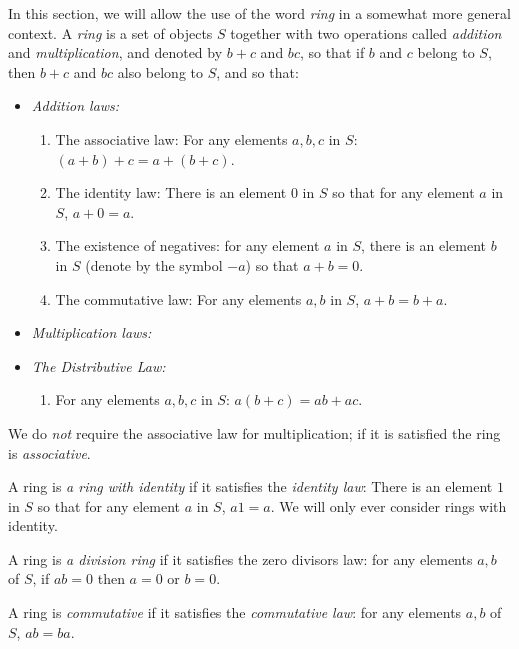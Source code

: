 In this section, we will allow the use of the word \emph{ring} in a somewhat more general context.
A \emph{ring} is a set of objects \(S\) together with two operations called \emph{addition} and \emph{multiplication}, and denoted by \(b+c\) and \(bc\), so that if \(b\) and \(c\) belong to \(S\), then \(b+c\) and \(bc\) also belong to \(S\), and so that:
\smallskip
\begin{itemize}
\item[]\emph{Addition laws:}
\begin{enumerate}
\item The associative law: For any elements \(a, b, c\) in \(S\): \((a+b)+c=a+(b+c)\).
\item The identity law: There is an element \(0\) in \(S\) so that for any element \(a\) in \(S\), \(a+0=a\).
\item The existence of negatives: for any element \(a\) in \(S\), there is an element \(b\) in \(S\) (denote by the symbol \(-a\)) so that \(a+b=0\).
\item The commutative law: For any elements \(a, b\) in \(S\), \(a+b=b+a\).
\end{enumerate}
\smallskip
\item[]\emph{Multiplication laws:}
\item[]\emph{The Distributive Law:}
\begin{enumerate}
\item For any elements \(a, b, c\) in \(S\): \(a(b+c)=ab+ac\).
\end{enumerate}
\end{itemize}
We do \emph{not} require the associative law for multiplication; if it is satisfied the ring is \emph{associative}.

A ring is \emph{a ring with identity} if it satisfies
the \emph{identity law}: There is an element \(1\) in \(S\) so that for any element \(a\) in \(S\), \(a1=a\).
We will only ever consider rings with identity.

A ring is \emph{a division ring} if it satisfies the zero divisors law: for any elements \(a, b\) of \(S\), if \(ab=0\) then \(a=0\) or \(b=0\).

A ring is \emph{commutative} if it satisfies the \emph{commutative law}: for any elements \(a, b\) of \(S\), \(ab=ba\).

